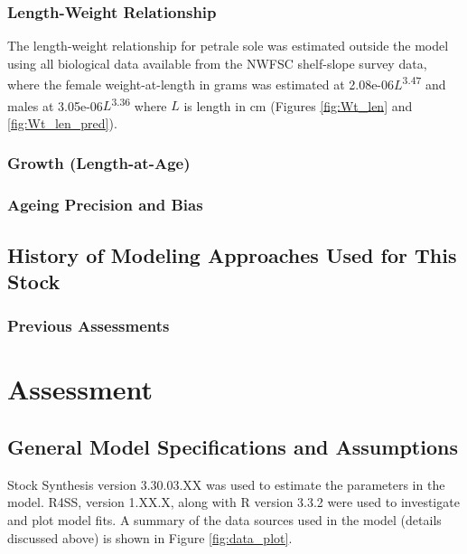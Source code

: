 \documentclass[12pt,]{article}
\begin{document}
\subsubsection{Length-Weight
Relationship}\label{length-weight-relationship}

The length-weight relationship for petrale sole was estimated outside
the model using all biological data available from the NWFSC shelf-slope
survey data, where the female weight-at-length in grams was estimated at
2.08e-06\(L\)\textsuperscript{3.47} and males at
3.05e-06\(L\)\textsuperscript{3.36} where \(L\) is length in cm (Figures
\ref{fig:Wt_len} and \ref{fig:Wt_len_pred}).

\subsubsection{Growth (Length-at-Age)}\label{growth-length-at-age}

\subsubsection{Ageing Precision and
Bias}\label{ageing-precision-and-bias}

\subsection{History of Modeling Approaches Used for This
Stock}\label{history-of-modeling-approaches-used-for-this-stock}

\subsubsection{Previous Assessments}\label{previous-assessments}

\section{Assessment}\label{assessment}

\subsection{General Model Specifications and
Assumptions}\label{general-model-specifications-and-assumptions}

Stock Synthesis version 3.30.03.XX was used to estimate the parameters
in the model. R4SS, version 1.XX.X, along with R version 3.3.2 were used
to investigate and plot model fits. A summary of the data sources used
in the model (details discussed above) is shown in Figure
\ref{fig:data_plot}.
\end{document}
